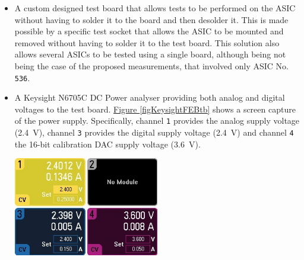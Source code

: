 \begin{itemize}
    \itemsep0em 
    \item A custom designed test board that allows tests to be performed on the ASIC without having to solder it to the board and then desolder it. This is made possible by a specific test socket that allows the ASIC to be mounted and removed without having to solder it to the test board. This solution also allows several ASICs to be tested using a single board, although being not being the case of the proposed measurements, that involved only ASIC No. \texttt{536}.
    \item A Keysight N6705C DC Power analyser providing both analog and digital voltages to the test board. \hyperref[figKeysightFEBtb]{Figure \ref{figKeysightFEBtb}} shows a screen capture of the power supply. Specifically, channel \texttt{1} provides the analog supply voltage (\SI{2.4}{\volt}), channel \texttt{3} provides the digital supply voltage (\SI{2.4}{\volt}) and channel \texttt{4} the 16-bit calibration DAC supply voltage (\SI{3.6}{\volt}).
    
    \begin{minipage}{\linewidth}
    \vspace{0.4cm}
        \centering
        \includegraphics[width=0.5\textwidth]{Images/chap1/power_supply_screen_TB.jpg}
        \label{figKeysightFEBtb}
        \vspace{0.4cm}
    \end{minipage}
    

\end{itemize}
